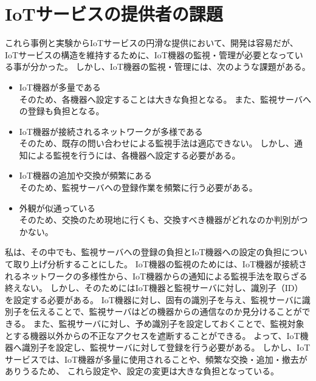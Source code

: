 \section{IoTサービスの提供者の課題}
これら事例と実験からIoTサービスの円滑な提供において、開発は容易だが、IoTサービスの構造を維持するために、IoT機器の監視・管理が必要となっている事が分かった。
しかし、IoT機器の監視・管理には、次のような課題がある。
\begin{itemize}
\item IoT機器が多量である\\
	そのため、各機器へ設定することは大きな負担となる。
	また、監視サーバへの登録も負担となる。
\item IoT機器が接続されるネットワークが多様である\\
	そのため、既存の問い合わせによる監視手法は適応できない。
	しかし、通知による監視を行うには、各機器へ設定する必要がある。
\item IoT機器の追加や交換が頻繁にある\\
	そのため、監視サーバへの登録作業を頻繁に行う必要がある。
\item 外観が似通っている\\
	そのため、交換のため現地に行くも、交換すべき機器がどれなのか判別がつかない。
\end{itemize}

私は、その中でも、監視サーバへの登録の負担とIoT機器への設定の負担について取り上げ分析することにした。
IoT機器の監視のためには、IoT機器が接続されるネットワークの多様性から、IoT機器からの通知による監視手法を取らざる終えない。
しかし、そのためにはIoT機器と監視サーバに対し、識別子（ID）を設定する必要がある。
IoT機器に対し、固有の識別子を与え、監視サーバに識別子を伝えることで、監視サーバはどの機器からの通信なのか見分けることができる。
また、監視サーバに対し、予め識別子を設定しておくことで、監視対象とする機器以外からの不正なアクセスを遮断することができる。
よって、IoT機器へ識別子を設定し、監視サーバに対して登録を行う必要がある。
しかし、IoTサービスでは、IoT機器が多量に使用されることや、頻繁な交換・追加・撤去がありうるため、
これら設定や、設定の変更は大きな負担となっている。

